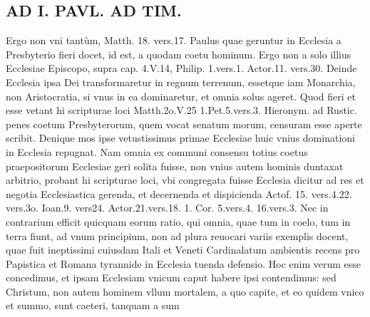 \documentclass{article}
\begin{document}
\begin{pages}
\section*{AD I. PAVL. AD TIM. }
\marginpar{[ p.242 ]}\pstart Ergo non vni tantùm, Matth. 18. vers.17. Paulus quae geruntur in Ecclesia a Presbyterio fieri docet, id est, a quodam coetu hominum. Ergo non a solo illius Ecclesiae Episcopo, supra cap. 4.V.14, Philip. 1.vers.1. Actor.11. vers.30. Deinde Ecclesia ipsa Dei transformaretur in regnum terrenum, essetque iam Monarchia, non Aristocratia, si vnus in ea dominaretur, et omnia solus ageret. Quod fieri et esse vetant hi scripturae loci Matth.2o.V.25 1.Pet.5.vers.3. Hieronym. ad Rustic. penes coetum Presbyterorum, quem vocat senatum morum, censuram esse aperte scribit.  \pend\pstart Denique mos ipse vetustissimus primae Ecclesiae huic vnius dominationi in Ecclesia repugnat. Nam omnia ex communi consensu totius coetus praepositorum Ecclesiae geri solita fuisse, non vnius autem hominis duntaxat arbitrio, probant hi scripturae loci, vbi congregata fuisse Ecclesia dicitur ad res et negotia Ecclesiastica gerenda, et decernenda et dispicienda Actof. 15. vers.4.22. vers.3o. Ioan.9. vers24. Actor.21.vers.18. 1. Cor. 5.vers.4. 16.vers.3.  \pend\pstart Nec in contrarium efficit quicquam eorum ratio, qui omnia, quae tum in coelo, tum in terra fiunt, ad vnum principium, non ad plura reuocari variis exemplis docent, quae fuit ineptissimi cuiusdam Itali et Veneti Cardinalatum ambientis recens pro Papistica et Romana tyrannide in Ecclesia tuenda defensio. Hoc enim verum esse concedimus, et ipsam Ecclesiam vnicum caput habere ipsi contendimus: sed Christum, non autem hominem vllum mortalem, a quo capite, et eo quidem vnico et summo, sunt caeteri, tanquam a sum\pend

\end{pages}
\end{document}
